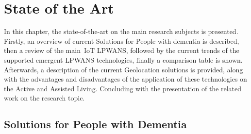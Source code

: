 \chapter{State of the Art}
\label{cha:state_of_the_art}

In this chapter, the state-of-the-art on the main research subjects is presented. 
Firstly, an overview of current Solutions for People with dementia is described, then a review of the main~\gls{IoT} LPWANS, followed by the current trends of the supported emergent LPWANS technologies, finally a comparison table is shown. 
Afterwards, a description of the current Geolocation solutions is provided, along with the advantages and disadvantages of the application of these technologies on the Active and Assisted Living. Concluding with the presentation of the related work on the research topic.

\section{Solutions for People with Dementia}
\label{sec:PWD_SOTA}

